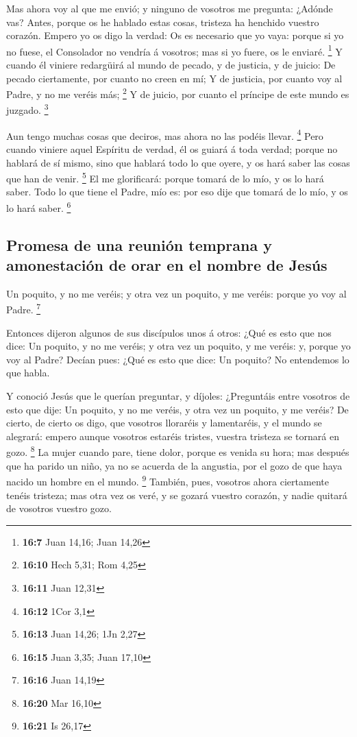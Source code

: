  Mas ahora voy al que me envió; y ninguno de vosotros me
pregunta: ¿Adónde vas?  Antes, porque os he hablado estas
cosas, tristeza ha henchido vuestro corazón.  Empero yo os
digo la verdad: Os es necesario que yo vaya: porque si yo no fuese, el
Consolador no vendría á vosotros; mas si yo fuere, os le enviaré.
\footnote{\textbf{16:7} Juan 14,16; Juan 14,26}  Y cuando
él viniere redargüirá al mundo de pecado, y de justicia, y de juicio:
 De pecado ciertamente, por cuanto no creen en mí;
 Y de justicia, por cuanto voy al Padre, y no me veréis
más; \footnote{\textbf{16:10} Hech 5,31; Rom 4,25}  Y de
juicio, por cuanto el príncipe de este mundo es juzgado. \footnote{\textbf{16:11}
  Juan 12,31}

 Aun tengo muchas cosas que deciros, mas ahora no las
podéis llevar. \footnote{\textbf{16:12} 1Cor 3,1}  Pero
cuando viniere aquel Espíritu de verdad, él os guiará á toda verdad;
porque no hablará de sí mismo, sino que hablará todo lo que oyere, y os
hará saber las cosas que han de venir. \footnote{\textbf{16:13} Juan
  14,26; 1Jn 2,27}  El me glorificará: porque tomará de
lo mío, y os lo hará saber.  Todo lo que tiene el Padre,
mío es: por eso dije que tomará de lo mío, y os lo hará saber.
\footnote{\textbf{16:15} Juan 3,35; Juan 17,10}

\hypertarget{promesa-de-una-reuniuxf3n-temprana-y-amonestaciuxf3n-de-orar-en-el-nombre-de-jesuxfas}{%
\subsection{Promesa de una reunión temprana y amonestación de orar en el
nombre de
Jesús}\label{promesa-de-una-reuniuxf3n-temprana-y-amonestaciuxf3n-de-orar-en-el-nombre-de-jesuxfas}}

 Un poquito, y no me veréis; y otra vez un poquito, y me
veréis: porque yo voy al Padre. \footnote{\textbf{16:16} Juan 14,19}

 Entonces dijeron algunos de sus discípulos unos á otros:
¿Qué es esto que nos dice: Un poquito, y no me veréis; y otra vez un
poquito, y me veréis: y, porque yo voy al Padre?  Decían
pues: ¿Qué es esto que dice: Un poquito? No entendemos lo que habla.

 Y conoció Jesús que le querían preguntar, y díjoles:
¿Preguntáis entre vosotros de esto que dije: Un poquito, y no me veréis,
y otra vez un poquito, y me veréis?  De cierto, de cierto
os digo, que vosotros lloraréis y lamentaréis, y el mundo se alegrará:
empero aunque vosotros estaréis tristes, vuestra tristeza se tornará en
gozo. \footnote{\textbf{16:20} Mar 16,10}  La mujer
cuando pare, tiene dolor, porque es venida su hora; mas después que ha
parido un niño, ya no se acuerda de la angustia, por el gozo de que haya
nacido un hombre en el mundo. \footnote{\textbf{16:21} Is 26,17}
 También, pues, vosotros ahora ciertamente tenéis
tristeza; mas otra vez os veré, y se gozará vuestro corazón, y nadie
quitará de vosotros vuestro gozo.

